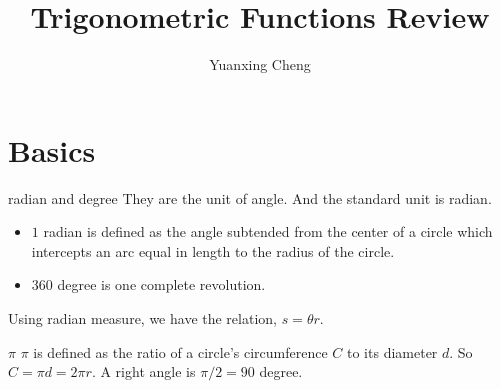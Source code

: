 \documentclass{article}
\title{Trigonometric Functions Review}
\author{Yuanxing Cheng}
\begin{document}
\maketitle

\section{Basics}
\begin{myleftlinebox}
    radian and degree
    \tcblower
    They are the unit of angle. And the standard unit is radian.
    \begin{itemize}
        \item $1$ radian is defined as the angle subtended from the center of a circle which intercepts an arc equal in length to the radius of the circle. 
        \item $360$ degree is one complete revolution.
    \end{itemize}
    Using radian measure, we have the relation, $s=\theta r$.
	\begin{center}
	\end{center}
\end{myleftlinebox}

\begin{myleftlinebox}
	$\pi$
	\tcblower
	$\pi$ is defined as the ratio of a circle's circumference $C$ to its diameter $d$. So $C=\pi d=2\pi r$. A right angle is $\pi/2=90$ degree.
\end{myleftlinebox}
\end{document}
